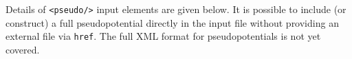 

Details of \texttt{<pseudo/>} input elements are given below.  It is possible to include (or construct) a full pseudopotential directly in the input file without providing an external file via \texttt{href}.  The full XML format for pseudopotentials is not yet covered.

\FloatBarrier
